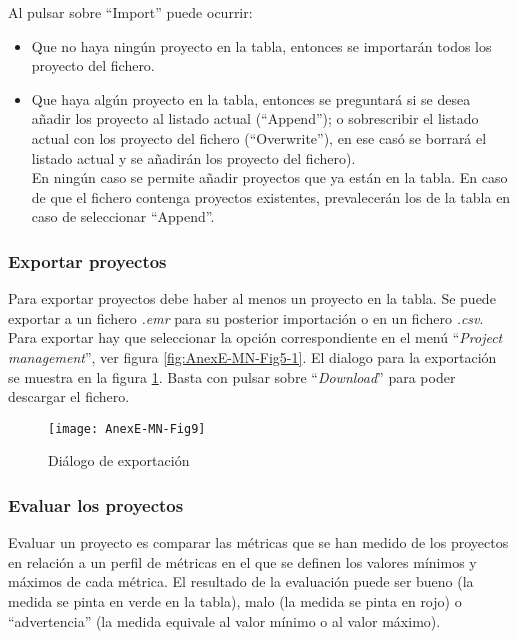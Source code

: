 Al pulsar sobre ``Import'' puede ocurrir:
\begin{itemize}
	\item Que no haya ningún proyecto en la tabla, entonces se importarán todos los proyecto del fichero.
	\item Que haya algún proyecto en la tabla, entonces se preguntará si se desea añadir los proyecto al listado actual (``Append''); o sobrescribir el listado actual con los proyecto del fichero (``Overwrite''), en ese casó se borrará el listado actual y se añadirán los proyecto del fichero).\\
	En ningún caso se permite añadir proyectos que ya están en la tabla. En caso de que el fichero contenga proyectos existentes, prevalecerán los de la tabla en caso de seleccionar ``Append''.
\end{itemize}


\subsubsection{Exportar proyectos}
Para exportar proyectos debe haber al menos un proyecto en la tabla.
Se puede exportar a un fichero \textit{.emr} para su posterior importación o en un fichero \textit{.csv}. Para exportar hay que seleccionar la opción correspondiente en el menú ``\textit{Project management}'', ver figura \ref{fig:AnexE-MN-Fig5-1}. El dialogo para la exportación se muestra en la figura \ref{fig:AnexE-MN-Fig9}. Basta con pulsar sobre ``\textit{Download}'' para poder descargar el fichero.
\begin{figure}[!h]
	\centering
	\texttt{[image: AnexE-MN-Fig9]}
	\caption{Diálogo de exportación}\label{fig:AnexE-MN-Fig9}
\end{figure}
\FloatBarrier

\subsubsection{Evaluar los proyectos}
Evaluar un proyecto es comparar las métricas que se han medido de los proyectos en relación a un perfil de métricas en el que se definen los valores mínimos y máximos de cada métrica. El resultado de la evaluación puede ser bueno (la medida se pinta en verde en la tabla), malo (la medida se pinta en rojo) o ``advertencia'' (la medida equivale al valor mínimo o al valor máximo).

